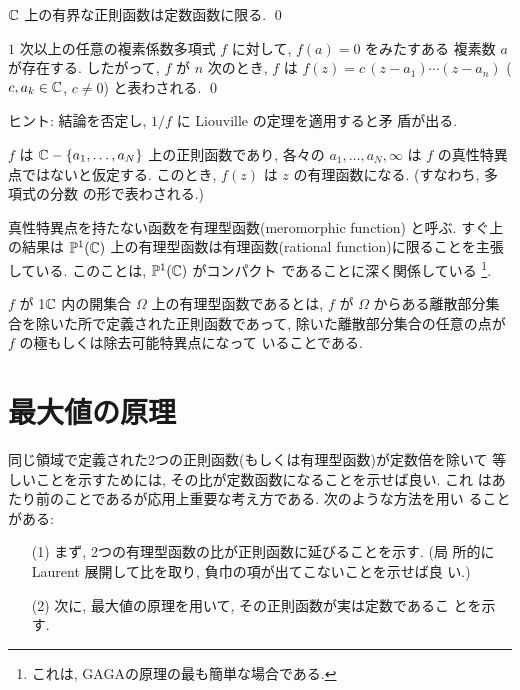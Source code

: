\documentclass[12pt,twoside]{jarticle}
\begin{document}
\begin{question}
  ${\mathbb C}$ 上の有界な正則函数は定数函数に限る. \qed
\end{question}

\begin{question}[代数学の基本定理]
  $1$ 次以上の任意の複素係数多項式 $f$ に対して, $f(a)=0$ をみたすある
  複素数 $a$ が存在する. したがって, $f$ が $n$ 次のとき, $f$ は %
  $f(z)=c\,(z-a_1)\cdots(z-a_n)$ ($c,a_k\in{\mathbb C}$, $c\ne0$) と表わされる.
  \qed
\end{question}

\noindent ヒント: 結論を否定し, $1/f$ に Liouville の定理を適用すると矛
盾が出る.


\begin{question}\label{q:rational-gaga}\qstar{*}
  $f$ は ${\mathbb C}-\{a_1,\dots,a_N\}$ 上の正則函数であり, %
  各々の $a_1,\dots,a_N,\infty$ は $f$ の真性特異点ではないと仮定する.
  このとき, $f(z)$ は $z$ の有理函数になる. (すなわち, 多項式の分数
  の形で表わされる.)
\end{question}

\noindent 真性特異点を持たない函数を有理型函数(meromorphic function) 
と呼ぶ. すぐ上の結果は ${\mathbb P}^1({\mathbb C})$ 上の有理型函数は有理函数(rational
function)に限ることを主張している. このことは, ${\mathbb P}^1({\mathbb C})$ がコンパクト
であることに深く関係している%
\footnote{これは, GAGAの原理の最も簡単な場合である.}.

$f$ が 1${\mathbb C}$ 内の開集合 $\Omega$ 上の有理型函数であるとは, $f$ が 
$\Omega$ からある離散部分集合を除いた所で定義された正則函数であって, 
除いた離散部分集合の任意の点が $f$ の極もしくは除去可能特異点になって
いることである. 


\section{最大値の原理}

同じ領域で定義された2つの正則函数(もしくは有理型函数)が定数倍を除いて
等しいことを示すためには, その比が定数函数になることを示せば良い. これ
はあたり前のことであるが応用上重要な考え方である. 次のような方法を用い
ることがある:
\begin{enumerate}
\item[(1)] まず, 2つの有理型函数の比が正則函数に延びることを示す. (局
  所的に Laurent 展開して比を取り, 負巾の項が出てこないことを示せば良
  い.)
\item[(2)] 次に, 最大値の原理を用いて, その正則函数が実は定数であるこ
  とを示す.
\end{enumerate}
\end{document}
